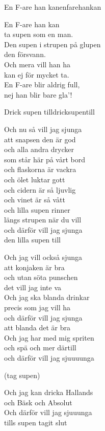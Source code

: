 \begin{song}{En F-are han kan}{enfarehankan}
\begin{vers}
En F-are han kan\\
ta supen som en man.\\
Den supen i strupen på glupen\\
den försvann.\\
Och mera vill han ha\\
kan ej för mycket ta.\\
En F-are blir aldrig full,\\
nej han blir bare gla'! \\
\end{vers}
\end{song}



\newpage

\begin{song}{Drick supen till}{dricksupentill}
\begin{vers}
Och nu så vill jag sjunga\\
att snapsen den är god\\
och alla andra drycker \\
som står här på vårt bord\\
och flaskorna är vackra\\
och ölet luktar gott\\
och cidern är så ljuvlig\\
och vinet är så vått\\
och lilla supen rinner\\
längs strupen när du vill\\
och därför vill jag sjunga\\
den lilla supen till\\
\end{vers}
\begin{vers}
Och jag vill också sjunga\\
att konjaken är bra\\
och utan söta punschen\\
det vill jag inte va\\
Och jag ska blanda drinkar\\
precis som jag vill ha\\
och därför vill jag sjunga\\
att blanda det är bra\\
Och jag har med mig spriten\\
och spä och mer därtill\\
och därför vill jag sjuuuunga\\
\end{vers}
\begin{vers}
(tag supen)\\
\end{vers}
\begin{vers}
Och jag kan dricka Hallands\\
och Bäsk och Absolut\\
Och därför vill jag sjuuunga\\
tills supen tagit slut\\
\end{vers}
\end{song}

